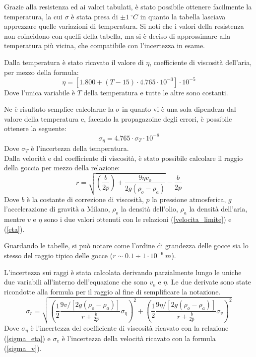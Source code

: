 \documentclass{article}
\begin{document}
Grazie alla resistenza ed ai valori tabulati, è stato possibile ottenere facilmente la temperatura, la cui $\sigma$ è stata presa di $\pm1\ ^\circ C$ in quanto la tabella lasciava apprezzare quelle variazioni di temperatura. Si noti che i valori della resistenza non coincidono con quelli della tabella, ma si è deciso di approssimare alla temperatura più vicina, che compatibile con l'incertezza in esame.

Dalla temperatura è stato ricavato il valore di $\eta$, coefficiente di viscosità dell'aria, per mezzo della formula:
\begin{equation}
	\eta=[1.800+(T-15)\cdot 4.765\cdot 10^{-3}]\cdot 10^{-5}
	\label{eta}
\end{equation}
Dove l'unica variabile è $T$ della temperatura e tutte le altre sono costanti.

Ne è risultato semplice calcolarne la $\sigma$ in quanto vi è una sola dipendeza dal valore della temperatura e, facendo la propagazoine degli errori, è possibile ottenere la seguente:
\begin{equation}
	\sigma_{\eta}=4.765\cdot\sigma_T\cdot 10^{-8}
	\label{sigma_eta}
\end{equation}
Dove $\sigma_T$ è l'incertezza della temperatura.\\

Dalla velocità e dal coefficiente di viscosità, è stato possibile calcolare il raggio della goccia per mezzo della relazione:
\begin{equation}
	r=\sqrt{\left(\frac{b}{2p}\right)+\frac{9\eta v_o}{2g(\rho_o-\rho_a)}}-\frac b{2p}
	\label{raggio}
\end{equation}
Dove $b$ è la costante di correzione di viscosità, $p$ la pressione atmosferica, $g$ l'accelerazione di gravità a Milano, $\rho_o$ la densità dell'olio, $\rho_a$ la densità dell'aria, mentre $v$ e $\eta$ sono i due valori ottenuti con le relazioni (\ref{velocita_limite}) e (\ref{eta}).

Guardando le tabelle, si può notare come l'ordine di grandezza delle gocce sia lo stesso del raggio tipico delle gocce ($r\sim0.1\div1\cdot10^{-6}\ m$).

L'incertezza sui raggi è stata calcolata derivando parzialmente lungo le uniche due variabili all'interno dell'equazione che sono $v_o$ e $\eta$. Le due derivate sono state ricondotte alla formula per il raggio al fine di semplificare la notazione.
\begin{equation}
	\sigma_r=\sqrt{\left(\frac12\frac{9v/[2g(\rho_o-\rho_a)]}{r+\frac b{2p}}\sigma_{\eta}\right)^2+\left(\frac12\frac{9\eta/[2g(\rho_o-\rho_a)]}{r+\frac b{2p}}\sigma_v\right)^2}
\end{equation}
Dove $\sigma_{\eta}$ è l'incertezza del coefficiente di viscosità ricavato con la relazione (\ref{sigma_eta}) e $\sigma_v$ è l'incertezza della velocità ricavato con la formula (\ref{sigma_v}).\\
\end{document}
